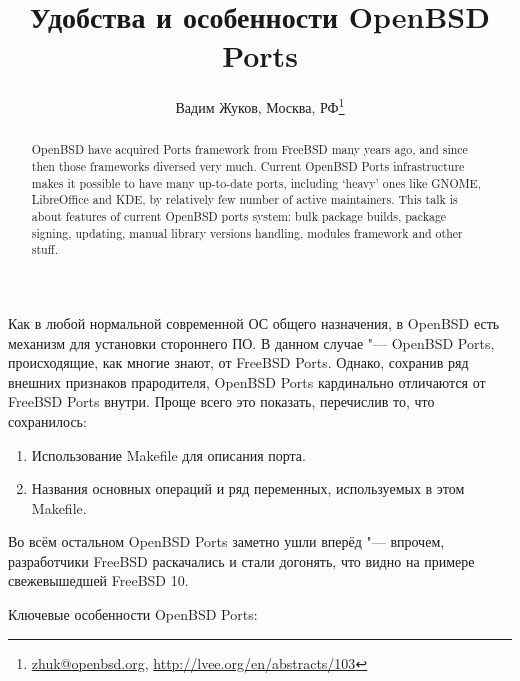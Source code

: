 \documentclass[10pt, a5paper]{article}
\begin{document}
\def\v!#1!{\texttt{#1}}
\title{Удобства и особенности OpenBSD Ports}
\author{Вадим Жуков, Москва, РФ\footnote{\url{zhuk@openbsd.org}, \url{http://lvee.org/en/abstracts/103}}}
\maketitle
\begin{abstract}
OpenBSD have acquired Ports framework from FreeBSD many years ago, and since then those frameworks diversed very much. Current OpenBSD Ports infrastructure makes it possible to have many up-to-date ports, including ‘heavy’ ones like GNOME, LibreOffice and KDE, by relatively few number of active main\-tainers. This talk is about features of current OpenBSD ports system: bulk package builds, package signing, updating, manual library versions handling, modules framework and other stuff.
\end{abstract}
Как в любой нормальной современной ОС общего назначения, в OpenBSD есть механизм для установки стороннего ПО. В данном случае "--- OpenBSD Ports, происходящие, как многие знают, от FreeBSD Ports. Однако, сохранив ряд внешних признаков прародителя, OpenBSD Ports кардинально отличаются от FreeBSD Ports внутри. Проще всего это показать, перечислив то, что сохранилось:

\begin{enumerate}
  \item Использование Makefile для описания порта.
  \item Названия основных операций и ряд переменных, используемых в этом Makefile.
\end{enumerate}

Во всём остальном OpenBSD Ports заметно ушли вперёд "--- впрочем, разработчики FreeBSD раскачались и стали догонять, что видно на примере свежевышедшей FreeBSD 10.

Ключевые особенности OpenBSD Ports:
\end{document}
